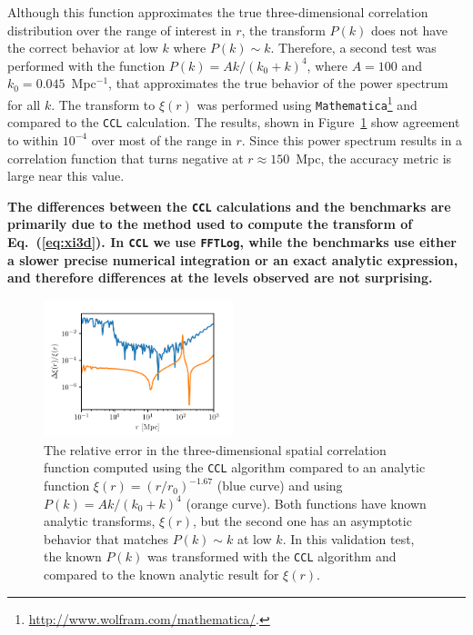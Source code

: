 \documentclass[\docopts]{\docclass}
\newcommand{\ccl}{{\tt CCL}\xspace}
\begin{document}
Although this function approximates the true three-dimensional correlation distribution over the range of interest in $r$, the transform $P(k)$ does not have the correct behavior at low $k$ where $P(k) \sim  k$. Therefore, a second test was performed with the function $P(k) = A k / (k_0 + k)^4$, where $A = 100$ and $k_0 = 0.045$~Mpc$^{-1}$, that approximates the true behavior of the power spectrum for all $k$.
The transform to $\xi(r)$ was performed using {\tt Mathematica}\footnote{\url{http://www.wolfram.com/mathematica/}.} and compared to the \ccl calculation. The results, shown in Figure~\ref{fig:analytic_xi} show agreement to within $10^{-4}$ over most of the range in $r$. Since this power spectrum results in a correlation function that turns negative at $r \approx 150$~Mpc, the accuracy metric is large near this value. 

{\bf The differences between the \ccl calculations and the benchmarks are primarily due to the method used to compute the transform of Eq.~(\ref{eq:xi3d}). In \ccl we use {\tt FFTLog}, while the benchmarks use either a slower precise numerical integration or an exact analytic expression, and therefore differences at the levels observed are not surprising.}

\begin{figure}[htbp]
\centering
\includegraphics[width=0.49\textwidth]{3dcorr_analytic}
\caption{The relative error in the three-dimensional spatial correlation function computed using the \ccl algorithm compared to an analytic function $\xi(r) = (r/r_0)^{-1.67}$ (blue curve) and using $P(k) = A k / (k_0 + k)^4$ (orange curve). Both functions have known analytic transforms, $\xi(r)$, but the second one has an asymptotic behavior that matches $P(k)\sim k$ at low $k$. In this validation test, the known $P(k)$ was transformed with the \ccl algorithm and compared to the known analytic result for $\xi(r)$.}
\label{fig:analytic_xi}
\end{figure}
\end{document}
